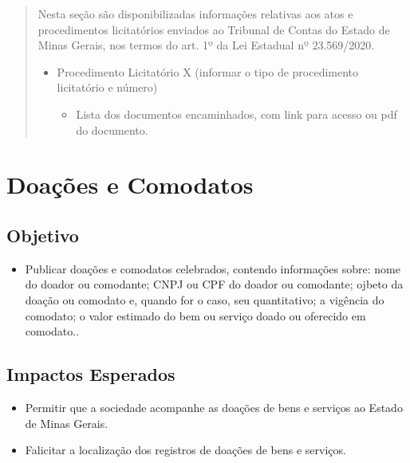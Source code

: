 \documentclass[
]{book}
\providecommand{\tightlist}{%
  \setlength{\itemsep}{0pt}\setlength{\parskip}{0pt}}
\begin{document}
\begin{quote}
Nesta seção são disponibilizadas informações relativas aos atos e procedimentos licitatórios enviados ao Tribunal de Contas do Estado de Minas Gerais, nos termos do art. 1º da Lei Estadual nº 23.569/2020.

\begin{itemize}
\tightlist
\item
  Procedimento Licitatório X (informar o tipo de procedimento licitatório e número)

  \begin{itemize}
  \tightlist
  \item
    Lista dos documentos encaminhados, com link para acesso ou pdf do documento.
  \end{itemize}
\end{itemize}
\end{quote}

\hypertarget{doauxe7uxf5es-e-comodatos}{%
\section{Doações e Comodatos}\label{doauxe7uxf5es-e-comodatos}}

\hypertarget{objetivo-11}{%
\subsection{Objetivo}\label{objetivo-11}}

\begin{itemize}
\tightlist
\item
  Publicar doações e comodatos celebrados, contendo informações sobre: nome do doador ou comodante; CNPJ ou CPF do doador ou comodante; ojbeto da doação ou comodato e, quando for o caso, seu quantitativo; a vigência do comodato; o valor estimado do bem ou serviço doado ou oferecido em comodato..
\end{itemize}

\hypertarget{impactos-esperados-12}{%
\subsection{Impactos Esperados}\label{impactos-esperados-12}}

\begin{itemize}
\tightlist
\item
  Permitir que a sociedade acompanhe as doações de bens e serviços ao Estado de Minas Gerais.
\item
  Falicitar a localização dos registros de doações de bens e serviços.
\end{itemize}
\end{document}
